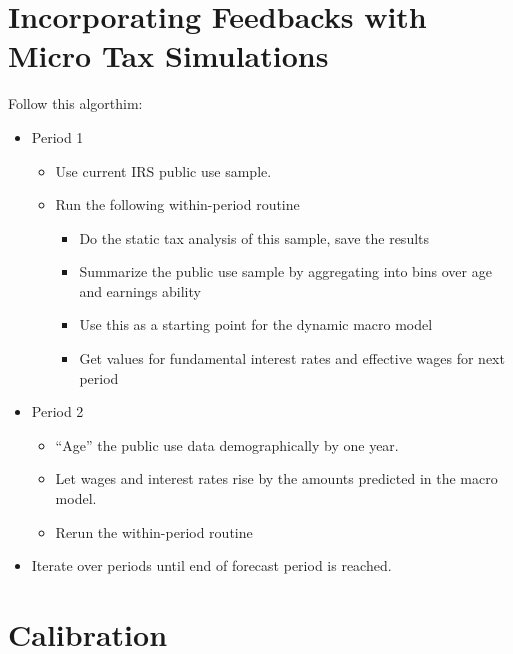 \documentclass[letterpaper,12pt]{article}
\theoremstyle{definition}
\numberwithin{equation}{section}
\begin{document}
\begin{spacing}{1.5}
\newpage

\section{Incorporating Feedbacks with Micro Tax Simulations}\label{SecMicro}

  Follow this algorthim:
  \begin{itemize}
    \item Period 1
    \begin{itemize}
      \item Use current IRS public use sample.
      \item Run the following within-period routine
      \begin{itemize}
        \item Do the static tax analysis of this sample, save the results
        \item Summarize the public use sample by aggregating into bins over age and earnings ability
        \item Use this as a starting point for the dynamic macro model
        \item Get values for fundamental interest rates and effective wages for next period
      \end{itemize}
    \end{itemize}
  \item Period 2
    \begin{itemize}
      \item “Age” the public use data demographically by one year.
      \item Let wages and interest rates rise by the amounts predicted in the macro model.
      \item Rerun the within-period routine
    \end{itemize}
  \item Iterate over periods until end of forecast period is reached.
  \end{itemize}

\section{Calibration}

\end{spacing}
\end{document}

